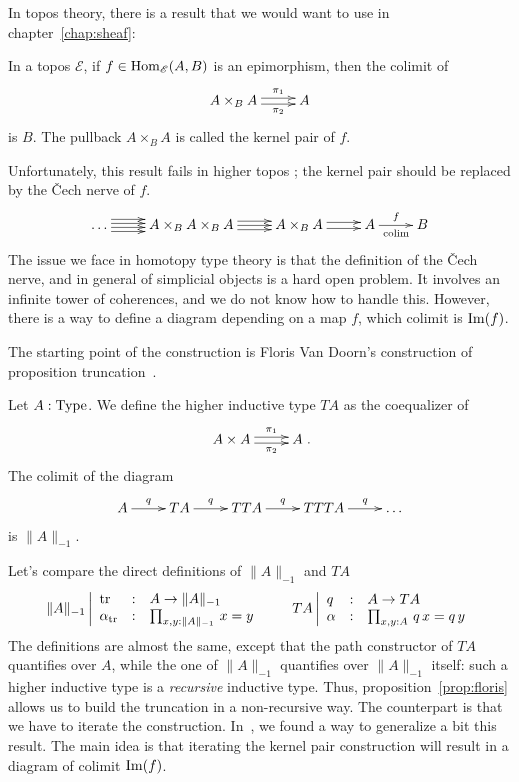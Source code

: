 In topos theory, there is a result that we would want to use in
chapter~\ref{chap:sheaf}:
\begin{lem}
  In a topos $\mathcal E$, if $f\in\mathrm{Hom}_{\mathcal E}(A,B)$ is an epimorphism, then the colimit
  of
  \[ \xymatrix{ A\times_B A \ar@<-.5ex>[r]_-{\pi_2}
      \ar@<.5ex>[r]^-{\pi_1} & A }\]
  is $B$. The pullback $A\times_B A$ is called the kernel pair of $f$.
  
\end{lem}
Unfortunately, this result fails in higher topos ; the kernel pair
should be replaced by the \v{C}ech nerve of $f$.
\[
  \xymatrix{
    \dots \ar@<-1ex>[r]\ar@<-.33ex>[r]\ar@<.33ex>[r]\ar@<1ex>[r] & A\times_B A\times_B A \ar@<-.7ex>[r] \ar[r] \ar@<.7ex>[r]
    & A\times_B A \ar@<-.5ex>[r] \ar@<.5ex>[r] & A \ar[r]^f_{\colim}& B
  }
\]
The issue we face in homotopy type theory is that the definition of
the \v{C}ech nerve, and in general of simplicial objects is a hard
open problem. It involves an infinite tower of coherences, and we
do not know how to handle this. However, there is a way to define a
diagram depending on a map $f$, which colimit is $\operatorname{Im}(f)$.

The starting point of the construction is Floris Van Doorn's
construction of proposition truncation~\cite{floris}. 

\begin{prop}\label{prop:floris}
  Let $A:\operatorname{Type}$. We define the higher inductive type $TA$ as the
  coequalizer of
  \[ \xymatrix{ A\times A \ar@<-.5ex>[r]_-{\pi_2}
      \ar@<.5ex>[r]^-{\pi_1} & A }.\]
  The colimit of the diagram
  \[ \xymatrix{
      A \ar[r]^-q& TA \ar[r]^-q& TTA \ar[r]^-q& TTTA \ar[r]^-q& \dots
    }\]
  is $\|A\|_{-1}$.
\end{prop}
Let's compare the direct definitions of $\|A\|_{-1}$ and $TA$
\[
  \|A\|_{-1} \left|
    \begin{array}{lll}
      \operatorname{tr} &:& A\to\|A\|_{-1} \\
      \alpha_{\operatorname{tr}} &:& \prod_{x,y:\|A\|_{-1}}\, x=y
    \end{array}
  \right.
  \qquad
  TA \left|
    \begin{array}{lll}
      q &:& A\to TA \\
      \alpha &:& \prod_{x,y:A}\, q\, x=q\, y
    \end{array}
  \right.
\]
The definitions are almost the same, except that the path constructor
of $TA$ quantifies over $A$, while the one of $\|A\|_{-1}$ quantifies
over $\|A\|_{-1}$ itself: such a higher inductive type is a {\em
  recursive} inductive type. Thus, proposition~\ref{prop:floris}
allows us to build the truncation in a non-recursive way. The
counterpart is that we have to iterate the
construction. In~\cite{boulier}, we found a way to generalize a bit
this result. The main idea is that iterating the kernel pair
construction will result in a diagram of colimit $\operatorname{Im}(f)$.

